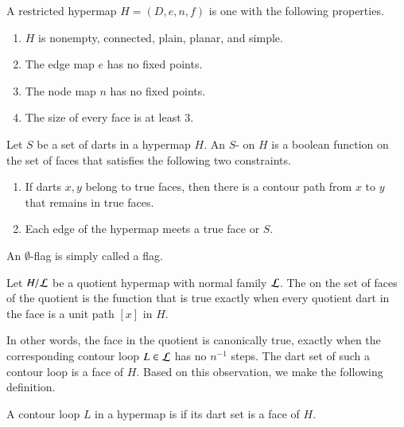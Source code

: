 \begin{definition}[restricted]\label{def:restricted}
A restricted hypermap $H = (D,e,n,f)$ is one with the following
properties.
\begin{enumerate}
\item $H$ is nonempty, connected, plain, planar, and simple.
\item The edge map $e$ has no fixed points.
\item The node map $n$ has no fixed points.
\item The size of every face is at least $3$.
\end{enumerate}
%
%
\end{definition}

\begin{definition}[flag] Let $S$ be a set of darts in a hypermap $H$.  An
$S$- on $H$ is a boolean function on the set of faces that satisfies
the following two constraints. 
\begin{enumerate}
\item If darts $x,y$ belong to true faces,
then there is a contour path from $x$ to $y$ that remains
in true faces.
\item Each edge of the hypermap meets a true face or $S$.
\end{enumerate}
An $\emptyset$-flag is simply called a flag.
%
%
\end{definition}


\begin{definition} Let $H/{\cal L}$ be a
quotient hypermap with normal family $\cal L$.  The
 on the set of faces of the
quotient is the function that is true exactly when every quotient dart in the
face is a unit path $[x]$ in $H$.  
%
\end{definition}

In other words, the face in the quotient is canonically true, exactly when the corresponding
contour loop $L\in {\cal L}$ has no $n^{-1}$ steps.  The dart set of such
a contour loop is a face of $H$.  Based on this observation, we make the following definition.

\begin{definition}
A contour loop $L$ in a hypermap is  if its dart set is a face of $H$.
\end{definition}

